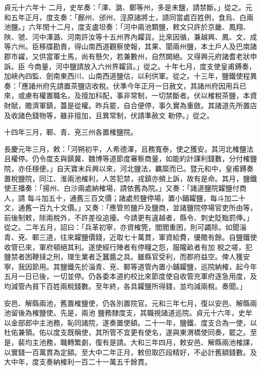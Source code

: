 \begin{pinyinscope}
 貞元十六年十
 二月，史牟奏：「澤、潞、鄭等州，多是末鹽，請禁斷。」從之。元和五年正月，度支奏：「鄜州、邠州、涇原諸將士，請同當處百姓例，食烏、白兩池鹽。」六年閏十二月，度支盧坦奏：「河中兩池顆鹽，敕文只許於京畿、鳳翔、陜、虢、河中澤潞、河南許汝等十五州界內糶貨。比來因循，兼越興、鳳、文、成等六州。臣移牒勘責，得山南西道觀察使報，其果、閬兩州鹽，本土戶人及巴南諸郡市糴，又供當軍士馬，尚有懸欠，若兼數州，自然闕絕。又得興元府諸耆老狀申訴。臣
 今商量，河中鹽請放入六州界糶貨。」從之。十年七月，度支使皇甫鎛奏，加峽內四監、劍南東西川、山南西道鹽估，以利供軍。從之。十三年，鹽鐵使程異奏：「應諸州府先請置茶鹽店收稅。伏準今年正月一日赦文，其諸州府因用兵已來，或慮有權置職名，及擅加科配，事非常制，一切禁斷者。伏以榷稅茶鹽，本資財賦，贍濟軍鎮，蓋是從權。昨兵罷，自合便停，事久實為重斂。其諸道先所置店及收諸色錢物等，雖非擅加，且異常制，伏請準赦文
 勒停。」從之。



 十四年三月，鄆、青、兗三州各置榷鹽院。



 長慶元年三月，敕：「河朔初平，人希德澤，且務寬泰，使之獲安。其河北榷鹽法且權停。仍令度支與鎮冀、魏博等道節度審察商量，如能約計課利錢數，分付榷鹽院，亦任穩便。」自天寶末兵興以來，河北鹽法，羈縻而已。暨元和中，皇甫鎛奏置稅鹽院，同江、淮兩池榷利，人苦犯禁，戎鎮亦頻上訴，故有是命。其月，鹽鐵使王播奏：「揚州、白沙兩處納榷場，請依舊為院。」又奏：「諸道鹽院糶鹽付商人，請
 每斗加五十，通舊三百文價；諸處煎鹽停場，置小鋪糶鹽，每斗加二十文，通舊一百九十文價。」又奏：「應管煎鹽戶及鹽商，並諸鹽院停場官吏所由等，前後制敕，除兩稅外，不許差役追擾。今請更有違越者，縣令、刺史貶黜罰俸。」從之。二年五月，詔曰：「兵革初寧，亦資榷筦，閭閻重困，則可蠲除。如聞淄青、兗、鄆三道，往來糶鹽價錢，近取七十萬貫，軍資給費，優贍有餘。自鹽鐵使收管已來，軍府頓絕其利。遂使經行陣者有停糧之怨，服隴畝者有加
 稅之嗟，犯鹽禁者困鞭撻之刑，理生業者乏蠶醬之具。雖縣官受利，而郡府益空。俾人獲安寧，我因節用。其鹽鐵先於淄青、兗、鄆等道管內置小鋪糶鹽，巡院納榷，起今年五月一日已後，一切並停。仍各委本道約校比來節度使自收管充軍府逐急用度，及均減管內貧下百姓兩稅錢數。至年終，各具糶鹽所得錢，並均減兩稅。奏聞。」



 安邑、解縣兩池，舊置榷鹽使，仍各別置院官。元和三年七月，復以安邑、解縣兩池留後為榷鹽使。先是，兩池
 鹽務隸度支，其職視諸道巡院。貞元十六年，史牟以金部郎中主池務，恥同諸院，遂奏置使額。二十一年，鹽鐵、度支合為一使，以杜佑兼領。佑以度支既稱使，其所管不宜更有使名，遂與東渭橋使同奏，罷之。至是，裴均主池務，職轉繁劇，復有是請。大和三年四月，敕安邑、解縣兩池榷課，以實錢一百萬貫為定額。至大中二年正月，敕但取匹段精好，不必計舊額錢數。及大中年，度支奏納榷利一百二十一萬五千餘貫。




\end{pinyinscope}
